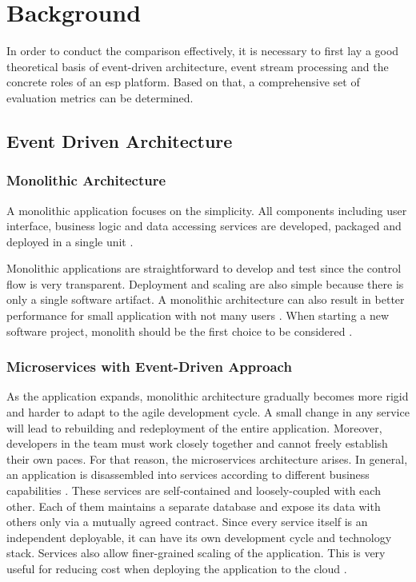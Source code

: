 \chapter{Background} \label{chap:background}
In order to conduct the comparison effectively, it is necessary to first lay a good theoretical basis of event-driven architecture, event stream processing and the concrete roles of an \acrshort{esp} platform. Based on that, a comprehensive set of evaluation metrics can be determined.


\section{Event Driven Architecture} \label{section:eventdriven}
\subsection{Monolithic Architecture}
A monolithic application focuses on the simplicity. All components including user interface, business logic and data accessing services are developed, packaged and deployed in a single unit \cite{monolith}.

Monolithic applications are straightforward to develop and test since the control flow is very transparent. Deployment and scaling are also simple because there is only a single software artifact. A monolithic architecture can also result in better performance for small application with not many users \cite{al2018comparative}. When starting a new software project, monolith should be the first choice to be considered \cite{monolithfirst}. 

\subsection{Microservices with Event-Driven Approach}
As the application expands, monolithic architecture gradually becomes more rigid and harder to adapt to the agile development cycle. A small change in any service will lead to rebuilding and redeployment of the entire application. Moreover, developers in the team must work closely together and cannot freely establish their own paces. For that reason, the microservices architecture arises. In general, an application is disassembled into services according to different business capabilities \cite{microservicesfowler}. These services are self-contained and loosely-coupled with each other. Each of them maintains a separate database and expose its data with others only via a mutually agreed contract. Since every service itself is an independent deployable, it can have its own development cycle and technology stack. Services also allow finer-grained scaling of the application. This is very useful for reducing cost when deploying the application to the cloud \cite{villamizar2016infrastructure}.


